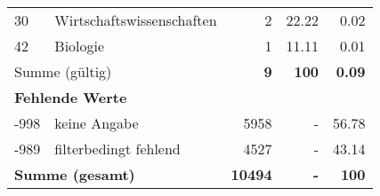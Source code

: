 \begin{longtable}{lXrrr}
     30 &
     \multicolumn{1}{X}{ Wirtschaftswissenschaften   } &


       \num{2} &
       \num[round-mode=places,round-precision=2]{22,22} &
         \num[round-mode=places,round-precision=2]{0,02} \\

     42 &
     \multicolumn{1}{X}{ Biologie   } &


       \num{1} &
       \num[round-mode=places,round-precision=2]{11,11} &
         \num[round-mode=places,round-precision=2]{0,01} \\
     \midrule
     \multicolumn{2}{l}{Summe (gültig)} &
       \textbf{\num{9}} &
     \textbf{100} &
       \textbf{\num[round-mode=places,round-precision=2]{0,09}} \\
     \multicolumn{5}{l}{\textbf{Fehlende Werte}}\\
       -998 &
       keine Angabe &
         \num{5958} &
        - &
         \num[round-mode=places,round-precision=2]{56,78} \\
       -989 &
       filterbedingt fehlend &
         \num{4527} &
        - &
         \num[round-mode=places,round-precision=2]{43,14} \\
     \midrule
     \multicolumn{2}{l}{\textbf{Summe (gesamt)}} &
          \textbf{\num{10494}} &
        \textbf{-} &
        \textbf{100} \\
     \bottomrule
     \end{longtable}
     
